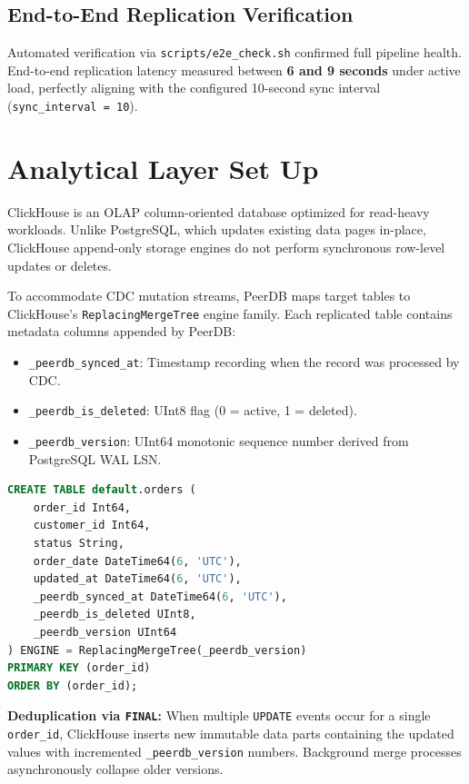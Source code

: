 \documentclass[peerreviewca]{IEEEtran}
\begin{document}
\subsection{End-to-End Replication Verification}
Automated verification via \texttt{scripts/e2e\_check.sh} confirmed full pipeline health. End-to-end replication latency measured between \textbf{6 and 9 seconds} under active load, perfectly aligning with the configured 10-second sync interval (\texttt{sync\_interval = 10}).

\section{Analytical Layer Set Up}
\label{sec:analytical}

ClickHouse is an OLAP column-oriented database optimized for read-heavy workloads. Unlike PostgreSQL, which updates existing data pages in-place, ClickHouse append-only storage engines do not perform synchronous row-level updates or deletes.

To accommodate CDC mutation streams, PeerDB maps target tables to ClickHouse's \texttt{ReplacingMergeTree} engine family. Each replicated table contains metadata columns appended by PeerDB:
\begin{itemize}
    \item \texttt{\_peerdb\_synced\_at}: Timestamp recording when the record was processed by CDC.
    \item \texttt{\_peerdb\_is\_deleted}: UInt8 flag (0 = active, 1 = deleted).
    \item \texttt{\_peerdb\_version}: UInt64 monotonic sequence number derived from PostgreSQL WAL LSN.
\end{itemize}

\begin{lstlisting}[language=SQL, caption={ClickHouse ReplacingMergeTree Table Definition.}]
CREATE TABLE default.orders (
    order_id Int64,
    customer_id Int64,
    status String,
    order_date DateTime64(6, 'UTC'),
    updated_at DateTime64(6, 'UTC'),
    _peerdb_synced_at DateTime64(6, 'UTC'),
    _peerdb_is_deleted UInt8,
    _peerdb_version UInt64
) ENGINE = ReplacingMergeTree(_peerdb_version)
PRIMARY KEY (order_id)
ORDER BY (order_id);
\end{lstlisting}

\textbf{Deduplication via \texttt{FINAL}:} When multiple \texttt{UPDATE} events occur for a single \texttt{order\_id}, ClickHouse inserts new immutable data parts containing the updated values with incremented \texttt{\_peerdb\_version} numbers. Background merge processes asynchronously collapse older versions. 
\end{document}
